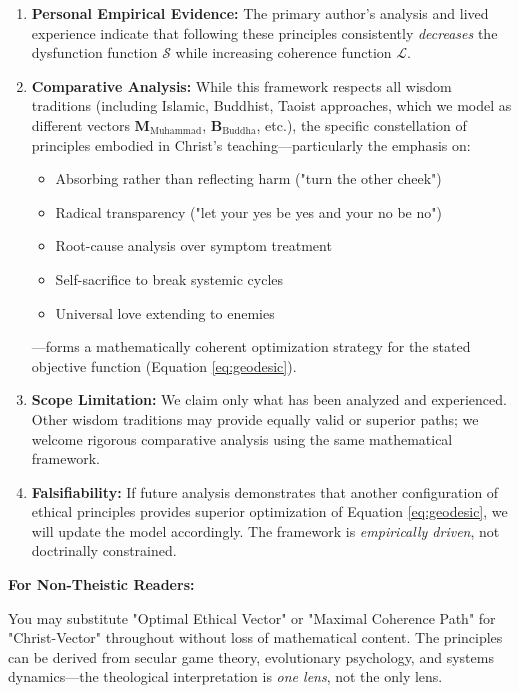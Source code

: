 \documentclass[11pt,a4paper]{article}
\theoremstyle{definition}
\theoremstyle{remark}
\begin{document}
\begin{small}
\begin{mdframed}[backgroundcolor=blue!5]
\begin{enumerate}
\item \textbf{Personal Empirical Evidence:} The primary author's analysis and lived experience indicate that following these principles consistently \textit{decreases} the dysfunction function $\mathcal{S}$ while increasing coherence function $\mathcal{L}$.

\item \textbf{Comparative Analysis:} While this framework respects all wisdom traditions (including Islamic, Buddhist, Taoist approaches, which we model as different vectors $\mathbf{M}_{\text{Muhammad}}$, $\mathbf{B}_{\text{Buddha}}$, etc.), the specific constellation of principles embodied in Christ's teaching—particularly the emphasis on:
\begin{itemize}
\item Absorbing rather than reflecting harm ("turn the other cheek")
\item Radical transparency ("let your yes be yes and your no be no")  
\item Root-cause analysis over symptom treatment
\item Self-sacrifice to break systemic cycles
\item Universal love extending to enemies
\end{itemize}
—forms a mathematically coherent optimization strategy for the stated objective function (Equation \ref{eq:geodesic}).

\item \textbf{Scope Limitation:} We claim only what has been analyzed and experienced. Other wisdom traditions may provide equally valid or superior paths; we welcome rigorous comparative analysis using the same mathematical framework.

\item \textbf{Falsifiability:} If future analysis demonstrates that another configuration of ethical principles provides superior optimization of Equation \ref{eq:geodesic}, we will update the model accordingly. The framework is \textit{empirically driven}, not doctrinally constrained.
\end{enumerate}

\textbf{For Non-Theistic Readers:}

You may substitute "Optimal Ethical Vector" or "Maximal Coherence Path" for "Christ-Vector" throughout without loss of mathematical content. The principles can be derived from secular game theory, evolutionary psychology, and systems dynamics—the theological interpretation is \textit{one lens}, not the only lens.


\end{mdframed}
\end{small}
\end{document}
